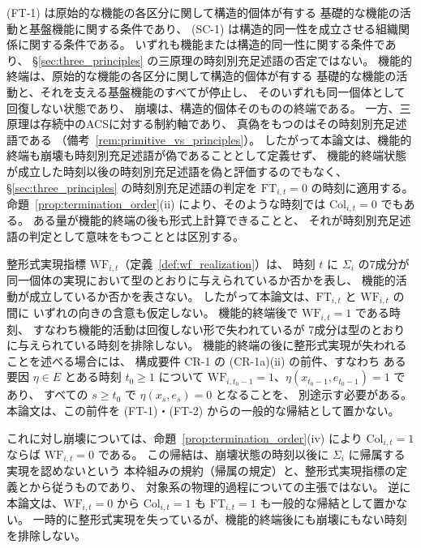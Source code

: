 \begin{remark}
\label{rem:collapse_not_principle_failure}
(FT-1) は原始的な機能の各区分に関して構造的個体が有する
基礎的な機能の活動と基盤機能に関する条件であり、
(SC-1) は構造的同一性を成立させる組織関係に関する条件である。
いずれも機能または構造的同一性に関する条件であり、
\S\ref{sec:three_principles} の三原理の時刻別充足述語の否定ではない。
機能的終端は、原始的な機能の各区分に関して構造的個体が有する
基礎的な機能の活動と、それを支える基盤機能のすべてが停止し、
そのいずれも同一個体として回復しない状態であり、
崩壊は、構造的個体そのものの終端である。
一方、三原理は存続中のACSに対する制約軸であり、
真偽をもつのはその時刻別充足述語である
（備考~\ref{rem:primitive_vs_principles}）。
したがって本論文は、機能的終端も崩壊も時刻別充足述語が偽であることとして定義せず、
機能的終端状態が成立した時刻以後の時刻別充足述語を偽と評価するのでもなく、
\S\ref{sec:three_principles} の時刻別充足述語の判定を
$\mathrm{FT}_{i,t}=0$ の時刻に適用する。
命題~\ref{prop:termination_order}(ii) により、そのような時刻では $\mathrm{Col}_{i,t}=0$ でもある。
ある量が機能的終端の後も形式上計算できることと、
それが時刻別充足述語の判定として意味をもつこととは区別する。
\end{remark}

\begin{remark}
\label{rem:collapse_wf_relation}
整形式実現指標 $\mathrm{WF}_{i,t}$（定義~\ref{def:wf_realization}）は、
時刻 $t$ に $\Sigma_i$ の7成分が同一個体の実現において型のとおりに与えられているか否かを表し、
機能的活動が成立しているか否かを表さない。
したがって本論文は、$\mathrm{FT}_{i,t}$ と $\mathrm{WF}_{i,t}$ の間に
いずれの向きの含意も仮定しない。
機能的終端後で $\mathrm{WF}_{i,t}=1$ である時刻、
すなわち機能的活動は回復しない形で失われているが
7成分は型のとおりに与えられている時刻を排除しない。
機能的終端の後に整形式実現が失われることを述べる場合には、
構成要件 CR-1 の (CR-1a)(ii) の前件、すなわち
ある要因 $\eta\in E$ とある時刻 $t_0\geq1$ について
$\mathrm{WF}_{i,t_0-1}=1$、$\eta(x_{t_0-1},e_{t_0-1})=1$ であり、
すべての $s\geq t_0$ で $\eta(x_s,e_s)=0$ となることを、
別途示す必要がある。
本論文は、この前件を (FT-1)・(FT-2) からの一般的な帰結として置かない。

これに対し崩壊については、命題~\ref{prop:termination_order}(iv) により
$\mathrm{Col}_{i,t}=1$ ならば $\mathrm{WF}_{i,t}=0$ である。
この帰結は、崩壊状態の時刻以後に $\Sigma_i$ に帰属する実現を認めないという
本枠組みの規約（帰属の規定）と、整形式実現指標の定義とから従うものであり、
対象系の物理的過程についての主張ではない。
逆に本論文は、$\mathrm{WF}_{i,t}=0$ から $\mathrm{Col}_{i,t}=1$ も $\mathrm{FT}_{i,t}=1$ も一般的な帰結として置かない。
一時的に整形式実現を失っているが、機能的終端後にも崩壊にもない時刻を排除しない。
\end{remark}

